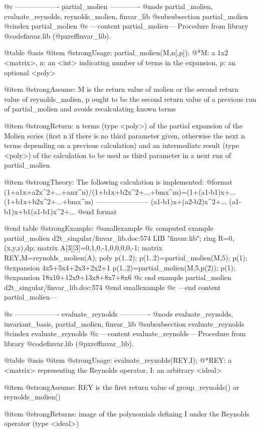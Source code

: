 @c ------------------- partial_molien -------------
@node partial_molien, evaluate_reynolds, reynolds_molien, finvar_lib
@subsubsection partial_molien
@cindex partial_molien
@c ---content partial_molien---
Procedure from library @code{finvar.lib} (@pxref{finvar_lib}).

@table @asis
@item @strong{Usage:}
partial_molien(M,n[,p]);
@*M: a 1x2 <matrix>, n: an <int> indicating number of terms in the
expansion, p: an optional <poly>

@item @strong{Assume:}
M is the return value of molien or the second return value of
reynolds_molien, p ought to be the second return value of a previous
run of partial_molien and avoids recalculating known terms

@item @strong{Return:}
n terms (type <poly>) of the partial expansion of the Molien series
(first n if there is no third parameter given, otherwise the next n
terms depending on a previous calculation) and an intermediate result
(type <poly>) of the calculation to be used as third parameter in a
next run of partial_molien

@item @strong{Theory:}
The following calculation is implemented:
@format
(1+a1x+a2x^2+...+anx^n)/(1+b1x+b2x^2+...+bmx^m)=(1+(a1-b1)x+...
(1+b1x+b2x^2+...+bmx^m)
-----------------------
   (a1-b1)x+(a2-b2)x^2+...
   (a1-b1)x+b1(a1-b1)x^2+...
@end format

@end table
@strong{Example:}
@smallexample
@c computed example partial_molien d2t_singular/finvar_lib.doc:574 
LIB "finvar.lib";
ring R=0,(x,y,z),dp;
matrix A[3][3]=0,1,0,-1,0,0,0,0,-1;
matrix REY,M=reynolds_molien(A);
poly p(1..2);
p(1..2)=partial_molien(M,5);
p(1);
@expansion{} 4x5+5x4+2x3+2x2+1
p(1..2)=partial_molien(M,5,p(2));
p(1);
@expansion{} 18x10+12x9+13x8+8x7+8x6
@c end example partial_molien d2t_singular/finvar_lib.doc:574
@end smallexample
@c ---end content partial_molien---

@c ------------------- evaluate_reynolds -------------
@node evaluate_reynolds, invariant_basis, partial_molien, finvar_lib
@subsubsection evaluate_reynolds
@cindex evaluate_reynolds
@c ---content evaluate_reynolds---
Procedure from library @code{finvar.lib} (@pxref{finvar_lib}).

@table @asis
@item @strong{Usage:}
evaluate_reynolds(REY,I);
@*REY: a <matrix> representing the Reynolds operator, I: an arbitrary
<ideal>

@item @strong{Assume:}
REY is the first return value of group_reynolds() or reynolds_molien()

@item @strong{Returns:}
image of the polynomials defining I under the Reynolds operator
(type <ideal>)


